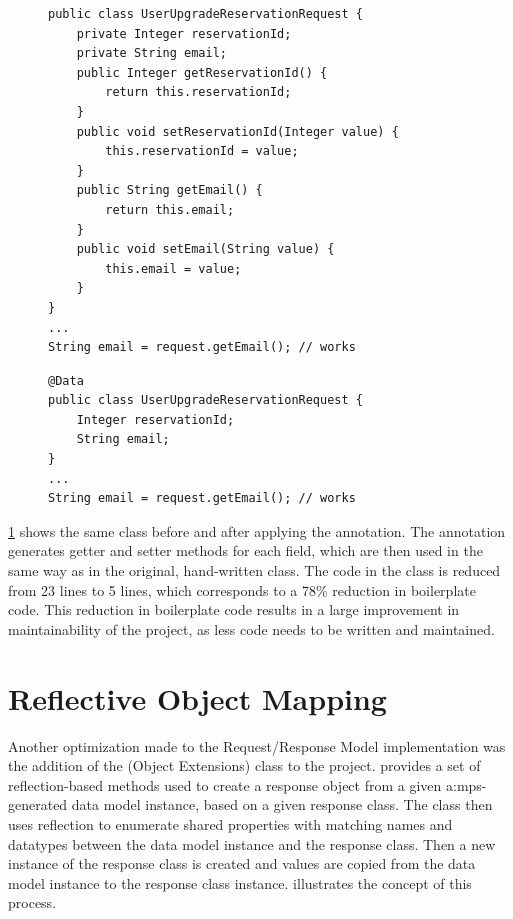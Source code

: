 \begin{figure}[H]
\begin{minipage}[t]{0.5\textwidth}
\begin{verbatim}
public class UserUpgradeReservationRequest {
    private Integer reservationId;
    private String email;
    public Integer getReservationId() {
        return this.reservationId;
    }
    public void setReservationId(Integer value) {
        this.reservationId = value;
    }
    public String getEmail() {
        return this.email;
    }
    public void setEmail(String value) {
        this.email = value;
    }
}
...
String email = request.getEmail(); // works
\end{verbatim}
\end{minipage}
\hfill
\begin{minipage}[t]{0.5\textwidth}
\begin{verbatim}
@Data
public class UserUpgradeReservationRequest {
    Integer reservationId;
    String email;
}
...
String email = request.getEmail(); // works
\end{verbatim}
\end{minipage}
\label{lst:lombok-example}
\end{figure}

\cref{lst:lombok-example} shows the same  class before and after applying the  annotation. The  annotation generates getter and setter methods for each field, which are then used in the same way as in the original, hand-written class. The code in the  class is reduced from 23 lines to 5 lines, which corresponds to a 78\% reduction in boilerplate code. This reduction in boilerplate code results in a large improvement in maintainability of the project, as less code needs to be written and maintained. 

\section{Reflective Object Mapping}\label{sec:impl-reflective-object-mapping}

Another optimization made to the Request/Response Model implementation was the addition of the  (Object Extensions) class to the project.  provides a set of reflection-based methods used to create a response object from a given \gls{a:mps}-generated data model instance, based on a given response class. The  class then uses reflection to enumerate shared properties with matching names and datatypes between the data model instance and the response class. Then a new instance of the response class is created and values are copied from the data model instance to the response class instance.  illustrates the concept of this process.

